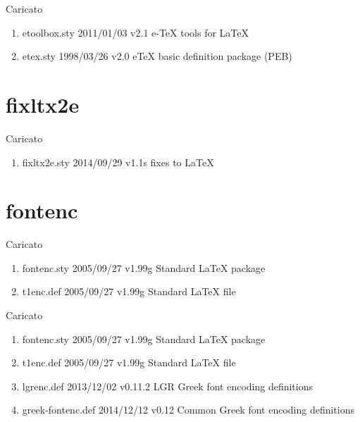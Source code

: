 Caricato 
\begin{enumerate}
\item etoolbox.sty 2011/01/03 v2.1 e-TeX tools for LaTeX
\item etex.sty 1998/03/26 v2.0 eTeX basic definition package (PEB)
\end{enumerate}
\section{fixltx2e}

Caricato 
\begin{enumerate}
\item fixltx2e.sty 2014/09/29 v1.1s fixes to LaTeX
\end{enumerate} 
\section{fontenc}

Caricato 
\begin{enumerate}
\item fontenc.sty 2005/09/27 v1.99g Standard LaTeX package
\item t1enc.def 2005/09/27 v1.99g Standard LaTeX file
\end{enumerate}

Caricato 
\begin{enumerate}
\item fontenc.sty 2005/09/27 v1.99g Standard LaTeX package
\item t1enc.def 2005/09/27 v1.99g Standard LaTeX file
\item lgrenc.def 2013/12/02 v0.11.2 LGR Greek font encoding definitions
\item greek-fontenc.def 2014/12/12 v0.12 Common Greek font encoding definitions
\end{enumerate}
